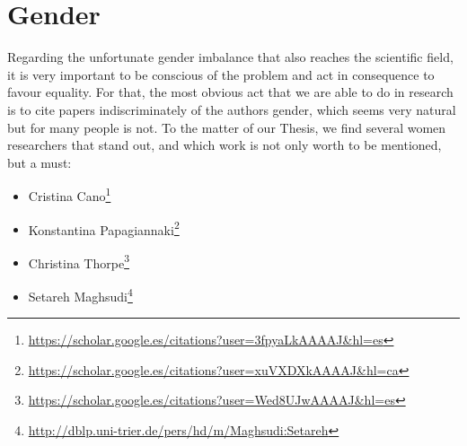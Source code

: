 \documentclass[12pt, a4paper,twoside]{article}
\begin{document}
	\section{Gender}
	\label{section:gender}	
	Regarding the unfortunate gender imbalance that also reaches the scientific field, it is very important to be conscious of the problem and act in consequence to favour equality. For that, the most obvious act that we are able to do in research is to cite papers indiscriminately of the authors gender, which seems very natural but for many people is not. To the matter of our Thesis, we find several women researchers that stand out, and which work is not only worth to be mentioned, but a must: 
	\begin{itemize}
		\item Cristina Cano\footnote{\url{https://scholar.google.es/citations?user=3fpyaLkAAAAJ&hl=es}}
		\item Konstantina Papagiannaki\footnote{\url{https://scholar.google.es/citations?user=xuVXDXkAAAAJ&hl=ca}}
		\item Christina Thorpe\footnote{\url{https://scholar.google.es/citations?user=Wed8UJwAAAAJ&hl=es}}
		\item Setareh Maghsudi\footnote{\url{http://dblp.uni-trier.de/pers/hd/m/Maghsudi:Setareh}}
	\end{itemize}	
			
	
	
\end{document}
